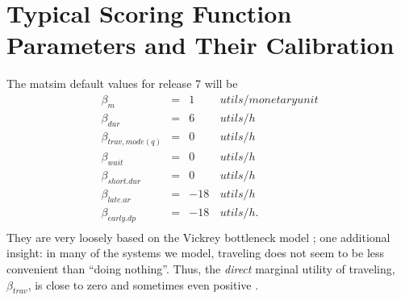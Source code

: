 \section{Typical Scoring Function Parameters and Their Calibration}
\label{sec:typicalParams}



The \gls{matsim} default values for release 7 will be
\begin{equation}
  \begin{array}{lcrl}
\beta_{m} & = & 1\, & utils/monetary unit \\
\beta_{dur} & = & 6\, & utils/h \\
\beta_{trav, mode(q)} & = & 0 & utils/h \\ %
\beta_{wait} & = & 0\, & utils/h \\
\beta_{short.dur} & = & 0\, & utils/h \\
\beta_{late.ar} & = & -18\, & utils/h \\
\beta_{early.dp} & = & -18\, & utils/h .\\
  \end{array}
\label{eq:std-params}
\end{equation}
They are very loosely based on the Vickrey bottleneck model \citep[e.g.][]{ArnottEtcBottleneck-inelastic}; one additional insight: in many of the systems we model, traveling does not seem to be less convenient than ``doing nothing''.  Thus, the \emph{direct} marginal utility of traveling, $\beta_{trav}$, is close to zero and sometimes even positive \citep[see, e.g.,][]{RedmondMokhtarian_Transportation_2001,PawlakEtAl_ICMC_2011} .


